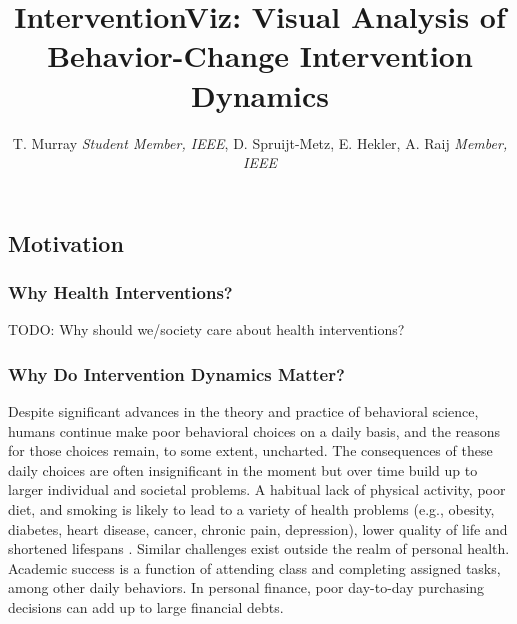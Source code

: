 \documentclass[review,journal]{vgtc}         %
\title{InterventionViz: Visual Analysis of Behavior-Change Intervention Dynamics}
\author{T. Murray \textit{Student Member, IEEE}, D. Spruijt-Metz, E. Hekler, A. Raij \textit{Member, IEEE}}
\begin{document}


\maketitle


\subsection{Motivation}

\subsubsection{Why Health Interventions?}
TODO: Why should we/society care about health interventions?

\subsubsection{Why Do Intervention Dynamics Matter?}
Despite significant advances in the theory and practice of behavioral science, humans continue make poor behavioral choices on a daily basis, and the reasons for those choices remain, to some extent, uncharted. 
The consequences of these daily choices are often insignificant in the moment but over time build up to larger individual and societal problems. 
A habitual lack of physical activity, poor diet, and smoking is likely to lead to a variety of health problems (e.g., obesity, diabetes, heart disease, cancer, chronic pain, depression), lower quality of life and shortened lifespans \cite{franco2005, dunn2001, yanbaeva2007, ross2000}. 
Similar challenges exist outside the realm of personal health. 
Academic success is a function of attending class and completing assigned tasks, among other daily behaviors\cite{cooper2006}.
In personal finance, poor day-to-day purchasing decisions can add up to large financial debts\cite{norvilitis2003}.
\end{document}
